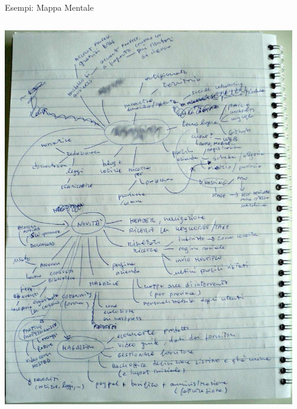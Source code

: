 	\begin{frame}{Esempi: Mappa Mentale}
		\begin{columns}[T]
		    \begin{column}{.5\textwidth}
				\includegraphics[scale=0.16]{images/mindmap-3}
		    \end{column}
		    \begin{column}{.5\textwidth}

\end{column}
\end{columns}
\end{frame}
